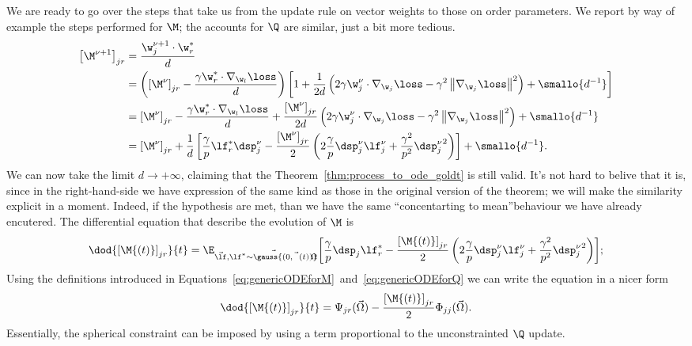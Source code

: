 We are ready to go over the steps that take us from the update rule on vector weights
to those on order parameters. We report by way of example the steps performed for \(\M\);
the accounts for \(\Q\) are similar, just a bit more tedious.
\[\begin{split}
  \left[\M^{\nu+1}\right]_{jr} &= \frac{\w^{\nu+1}_j\cdot\w_r^*}{d} \\
    &= \left(\left[\M^{\nu}\right]_{jr} - \frac{\gamma\w_r^*\cdot\nabla_{\w_l}{\loss}}{d}\right)\left[1+ \frac{1}{2d}\left(2\gamma\w^{\nu}_j\cdot \nabla_{\w_j}{\loss}-\gamma^2\left\|\nabla_{\w_j}{\loss}\right\|^2\right)+\smallo{d^{-1}}\right]\\
    &= \left[\M^{\nu}\right]_{jr} - \frac{\gamma\w_r^*\cdot\nabla_{\w_l}{\loss}}{d} + \frac{\left[\M^{\nu}\right]_{jr}}{2d}\left(2\gamma\w^{\nu}_j\cdot \nabla_{\w_j}{\loss}-\gamma^2\left\|\nabla_{\w_j}{\loss}\right\|^2\right)+\smallo{d^{-1}} \\
    &= \left[\M^{\nu}\right]_{jr} +\frac{1}{d}\left[
      \frac{\gamma}{p} \lf^*_r\dsp^\nu_j -
      \frac{\left[\M^{\nu}\right]_{jr}}{2}\left(2\frac{\gamma}{p}\dsp^\nu_j\lf^\nu_j + \frac{\gamma^2}{p^2} {\dsp^\nu_j}^2\right)
    \right] + \smallo{d^{-1}}.
\end{split}\]
We can now take the limit \(d\to+\infty\), claiming that the Theorem~\ref{thm:process_to_ode_goldt} is still valid.
It's not hard to belive that it is, since in the right-hand-side we have expression of the same kind
as those in the original version of the theorem; we will make the similarity explicit in a moment.
Indeed, if the hypothesis are met, than we have the same ``concentarting to mean''behaviour we have already encutered.
The differential equation that describe the evolution of \(\M\) is
\[
  \dod{\left[\M{\left(t\right)}\right]_{jr}}{t} =\E_{\vec{\lf},\vec{\lf^* \sim \gauss{(0,\vec{\Omega}{(t)})}}}{\left[\frac{\gamma}{p} \dsp_j \lf_r^* - \frac{\left[\M{\left(t\right)}\right]_{jr}}{2}\left(2\frac{\gamma}{p}\dsp^\nu_j\lf^\nu_j + \frac{\gamma^2}{p^2} {\dsp^\nu_j}^2\right)\right]};
\]
Using the definitions introduced in Equations~\eqref{eq:genericODEforM}~and~\eqref{eq:genericODEforQ} we can write the equation in a nicer form
\begin{equation} \label{eq:genericsphericalM}
  \dod{\left[\M{\left(t\right)}\right]_{jr}}{t} = \Psi_{jr}{(\vec{\Omega})} - \frac{\left[\M{\left(t\right)}\right]_{jr}}{2}\Phi_{jj}{(\vec{\Omega})}.
\end{equation}
Essentially, the spherical constraint can be imposed by using a term proportional to the unconstrainted \(\Q\) update.

